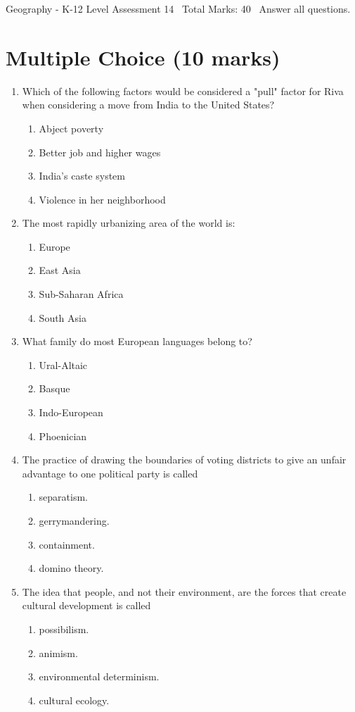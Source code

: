 \documentclass[12pt]{article}
\begin{document}
\begin{center}
Geography - K-12 Level Assessment 14 \
Total Marks: 40 \
Answer all questions.
\end{center}

\section*{Multiple Choice (10 marks)}
\begin{enumerate}[label=\arabic*.]
\item Which of the following factors would be considered a "pull" factor for Riva when considering a move from India to the United States?
\begin{enumerate}[label=(\alph*)]
    \item Abject poverty
    \item Better job and higher wages
    \item India's caste system
    \item Violence in her neighborhood
\end{enumerate}
\item The most rapidly urbanizing area of the world is:
\begin{enumerate}[label=(\alph*)]
    \item Europe
    \item East Asia
    \item Sub-Saharan Africa
    \item South Asia
\end{enumerate}
\item What family do most European languages belong to?
\begin{enumerate}[label=(\alph*)]
    \item Ural-Altaic
    \item Basque
    \item Indo-European
    \item Phoenician
\end{enumerate}
\item The practice of drawing the boundaries of voting districts to give an unfair advantage to one political party is called
\begin{enumerate}[label=(\alph*)]
    \item separatism.
    \item gerrymandering.
    \item containment.
    \item domino theory.
\end{enumerate}
\item The idea that people, and not their environment, are the forces that create cultural development is called
\begin{enumerate}[label=(\alph*)]
    \item possibilism.
    \item animism.
    \item environmental determinism.
    \item cultural ecology.
\end{enumerate}
\end{enumerate}
\end{document}
